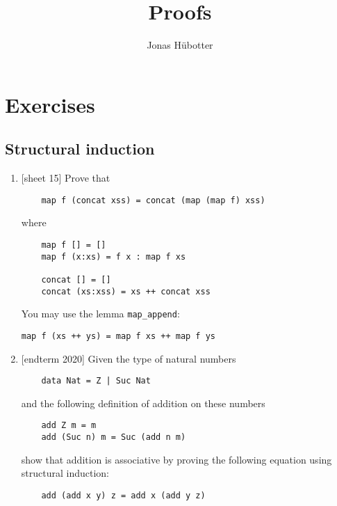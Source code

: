 \documentclass{article}
\title{Proofs}
\author{Jonas Hübotter}
\def\code#1{\texttt{#1}}
\begin{document}
\maketitle

\section{Exercises}

\subsection{Structural induction}
\begin{enumerate}
    \item {[sheet 15]} Prove that
        \begin{verbatim}
    map f (concat xss) = concat (map (map f) xss)
        \end{verbatim}
        where
        \begin{verbatim}
    map f [] = []
    map f (x:xs) = f x : map f xs

    concat [] = []
    concat (xs:xss) = xs ++ concat xss
        \end{verbatim}
        You may use the lemma \code{map\_append}: \par
        \code{map f (xs ++ ys) = map f xs ++ map f ys}

    \item {[endterm 2020]} Given the type of natural numbers
        \begin{verbatim}
    data Nat = Z | Suc Nat
        \end{verbatim}
        and the following definition of addition on these numbers
        \begin{verbatim}
    add Z m = m
    add (Suc n) m = Suc (add n m)
        \end{verbatim}
        show that addition is associative by proving the following equation using structural induction:
        \begin{verbatim}
    add (add x y) z = add x (add y z)
        \end{verbatim}
\end{enumerate}
\end{document}
